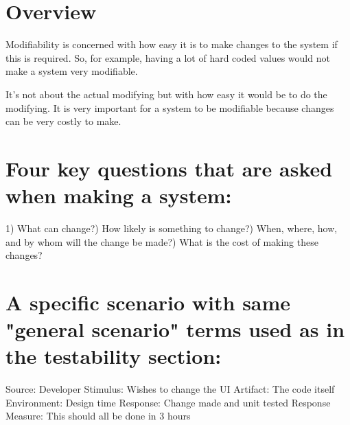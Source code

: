 \documentclass[a4paper]{report}
\begin{document}
\section{Overview}
Modifiability is concerned with how easy it is to make changes to the system if this is required. So, for example, having a lot of hard coded values would not make a system very modifiable.

It's not about the actual modifying but with how easy it would be to do the modifying.
It is very important for a system to be modifiable because changes can be very costly to make.

\section{Four key questions that are asked when making a system:}
1)   What can change?)   How likely is something to change?)   When, where, how, and by whom will the change be made?)   What is the cost of making these changes? \newline

\section{A specific scenario with same "general scenario" terms used as in the testability section:}

Source: Developer \newline
Stimulus: Wishes to change the UI \newline
Artifact: The code itself \newline
Environment: Design time \newline
Response: Change made and unit tested \newline
Response Measure: This should all be done in 3 hours \newline
\end{document}
